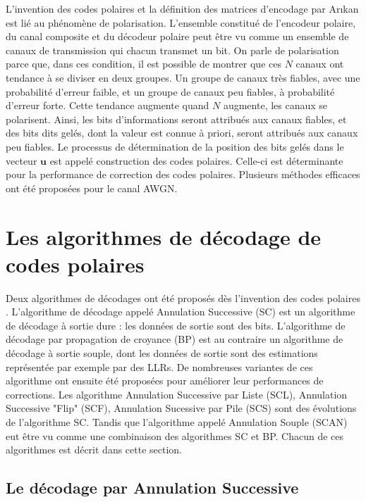 L'invention des codes polaires et la définition des matrices d'encodage par Ar{\i}kan \cite{arikan_channel_2009} est lié au phénomène de polarisation. L'ensemble constitué de l'encodeur polaire, du canal composite et du décodeur polaire peut être vu comme un ensemble de canaux de transmission qui chacun transmet un bit. On parle de polarisation parce que, dans ces condition, il est possible de montrer que ces $N$ canaux ont tendance à se diviser en deux groupes. Un groupe de canaux très fiables, avec une probabilité d'erreur faible, et un groupe de canaux peu fiables, à probabilité d'erreur forte. Cette tendance augmente quand $N$ augmente, les canaux se polarisent. Ainsi, les bits d'informations seront attribués aux canaux fiables, et des bits dits gelés, dont la valeur est connue à priori, seront attribués aux canaux peu fiables. Le processus de détermination de la position des bits gelés dans le vecteur $\mathbold{u}$ est appelé construction des codes polaires. Celle-ci est déterminante pour la performance de correction des codes polaires. Plusieurs méthodes efficaces ont été proposées \cite{tal_how_2013,trifonov_efficient_2012} pour le canal AWGN.

\section{Les algorithmes de décodage de codes polaires}

Deux algorithmes de décodages ont été proposés dès l'invention des codes polaires \cite{arikan_channel_2009}. L'algorithme de décodage appelé Annulation Successive (SC) est un algorithme de décodage à sortie dure : les données de sortie sont des bits. L'algorithme de décodage par propagation de croyance (BP) est au contraire un algorithme de décodage à sortie souple, dont les données de sortie sont des estimations représentée par exemple par des LLRs. De nombreuses variantes de ces algorithme ont ensuite été proposées pour améliorer leur performances de corrections. Les algorithme Annulation Successive par Liste (SCL), Annulation Successive "Flip" (SCF), Annulation Sucessive par Pile (SCS) sont des évolutions de l'algorithme SC. Tandis que l'algorithme appelé Annulation Souple (SCAN) eut être vu comme une combinaison des algorithmes SC et BP. Chacun de ces algorithmes est décrit dans cette section.

\subsection{Le décodage par Annulation Successive}

